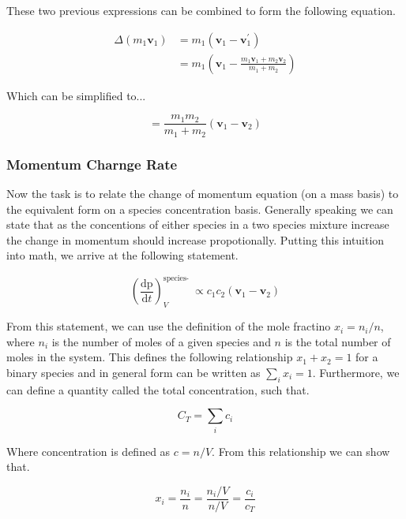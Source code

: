 \documentclass[lettersize,journal]{IEEEtran}
\begin{document}
These two previous expressions can be combined to form the following equation.

\begin{equation}
  \begin{aligned}
  \Delta\left(m_{1} \mathbf{v}_{1}\right) &=m_{1}\left(\mathbf{v}_{1}-\mathbf{v}_{1}^{\prime}\right) \\
  &=m_{1}\left(\mathbf{v}_{1}-\frac{m_{1} \mathbf{v}_{1}+m_{2} \mathbf{v}_{2}}{m_{1}+m_{2}}\right)
  \end{aligned}
\end{equation}

Which can be simplified to...

\begin{equation}
  =\frac{m_{1} m_{2}}{m_{1}+m_{2}}\left(\mathbf{v}_{1}-\mathbf{v}_{2}\right)
\end{equation}

\subsubsection{Momentum Charnge Rate}
Now the task is to relate the change of momentum equation (on a mass basis) to the equivalent form on a species concentration basis. Generally speaking we can state that as the concentions of either species in a two species mixture increase the change in momentum should increase propotionally. Putting this intuition into math, we arrive at the following statement.

\begin{equation}
  \left(\frac{\mathrm{dp}}{\mathrm{d} t}\right)_{V}^{\text {species- }} \propto c_{1} c_{2}\left(\mathbf{v}_{1}-\mathbf{v}_{2}\right)
\end{equation}

From this statement, we can use the definition of the mole fractino $x_i = n_i /n$, where $n_i$ is the number of moles of a given species and $n$ is the total number of moles in the system. This defines the following relationship $x_1 + x_2 = 1$ for a binary species and in general form can be written as $\sum_i x_i = 1$. Furthermore, we can define a quantity called the total concentration, such that.

\begin{equation}
  C_{T}=\sum_{i} c_{i}
\end{equation}

Where concentration is defined as $c = n/ V$.  From this relationship we can show that.

\begin{equation}
  x_{i}=\frac{n_{i}}{n}=\frac{n_{i} / V}{n / V}=\frac{c_{i}}{c_{T}}
\end{equation}
\end{document}
